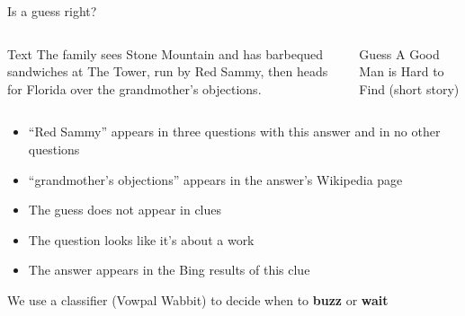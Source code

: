 \documentclass[compress]{beamer}
\begin{document}
\begin{frame}{Is a guess right?}

	\begin{columns}
	\begin{block}{Text}
	The family sees Stone Mountain and has barbequed sandwiches at The Tower, run by Red Sammy, then heads for Florida over the grandmother's objections.
	\end{block}
	\begin{block}{Guess}
	A Good Man is Hard to Find (short story)
	\end{block}
	\end{columns}
	
	\begin{itemize}
		\item ``Red Sammy'' appears in three questions with this answer and in no other questions
		\item ``grandmother's objections'' appears in the answer's Wikipedia page
		\item The guess does not appear in clues
		\item The question looks like it's about a work
		\item The answer appears in the Bing results of this clue
	\end{itemize}
	
	\pause
	
	We use a classifier (Vowpal Wabbit) to decide when to {\bf buzz} or {\bf wait}

\end{frame}
\end{document}
